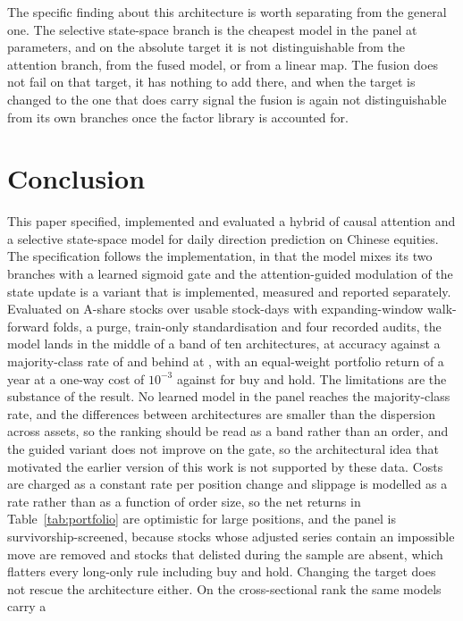 \documentclass[pdflatex,sn-mathphys-ay]{sn-jnl}
\theoremstyle{thmstyleone}%
\theoremstyle{thmstyletwo}%
\theoremstyle{thmstyletwo}%
\begin{document}
The specific finding about this architecture is worth separating from the general one. The selective
state-space branch is the cheapest model in the panel at \paramSSM{} parameters, and on the absolute
target it is not distinguishable from the attention branch, from the fused model, or from a linear
map. The fusion does not fail on that target, it has nothing to add there, and when the target is
changed to the one that does carry signal the fusion is again not distinguishable from its own
branches once the factor library is accounted for.

\section{Conclusion}\label{sec6}

This paper specified, implemented and evaluated a hybrid of causal attention and a selective
state-space model for daily direction prediction on Chinese equities. The specification follows the
implementation, in that the model mixes its two branches with a learned sigmoid gate and the
attention-guided modulation of the state update is a variant that is implemented, measured and
reported separately. Evaluated on \nStocks{} A-share stocks over \nStockDays{} usable stock-days
with expanding-window walk-forward folds, a purge, train-only standardisation and four recorded
audits, the model lands in the middle of a band of ten architectures, at \accProp{} accuracy against
a majority-class rate of \accMaj and behind \accBestName{} at \accBest, with an equal-weight
portfolio return of \portAnnProp{} a year at a one-way cost of $10^{-3}$ against \portAnnBH{} for buy
and hold. The limitations are the substance of the result. No learned model in the panel reaches the
majority-class rate, and the differences between architectures are smaller than the dispersion
across assets, so the ranking should be read as a band rather than an order, and the guided variant
does not improve on the gate, so the architectural idea that motivated the earlier version of this
work is not supported by these data. Costs are charged as a constant rate per position change and
slippage is modelled as a rate rather than as a function of order size, so the net returns in
Table~\ref{tab:portfolio} are optimistic for large positions, and the panel is survivorship-screened,
because stocks whose adjusted series contain an impossible move are removed and stocks that delisted
during the sample are absent, which flatters every long-only rule including buy and hold. Changing the
target does not rescue the architecture either. On the cross-sectional rank the same models carry a
\end{document}
